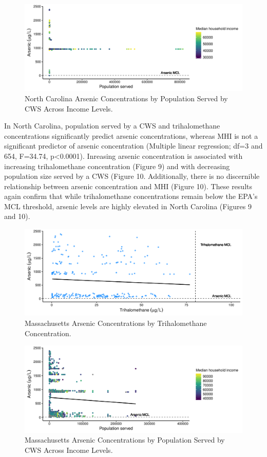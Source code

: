 \documentclass[12pt,]{article}
\begin{document}
\begin{figure}
\centering
\includegraphics{Project_Template_files/figure-latex/figs10-1.pdf}
\caption{North Carolina Arsenic Concentrations by Population Served by
CWS Across Income Levels.}
\end{figure}

In North Carolina, population served by a CWS and trihalomethane
concentrations significantly predict arsenic concentrations, whereas MHI
is not a significant predictor of arsenic concentration (Multiple linear
regression; df=3 and 654, F=34.74, p\textless{}0.0001). Inreasing
arsenic concentration is associated with increasing trihalomethane
concentration (Figure 9) and with decreasing population size served by a
CWS (Figure 10. Additionally, there is no discernible relationship
between arsenic concentration and MHI (Figure 10). These results again
confirm that while trihalomethane concentrations remain below the EPA's
MCL threshold, arsenic levels are highly elevated in North Carolina
(Figures 9 and 10).

\newpage

\begin{figure}
\centering
\includegraphics{Project_Template_files/figure-latex/figs11-1.pdf}
\caption{Massachusetts Arsenic Concentrations by Trihalomethane
Concentration.}
\end{figure}

\begin{figure}
\centering
\includegraphics{Project_Template_files/figure-latex/figs12-1.pdf}
\caption{Massachusetts Arsenic Concentrations by Population Served by
CWS Across Income Levels.}
\end{figure}
\end{document}
